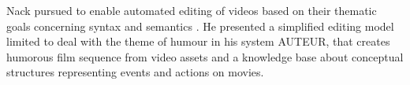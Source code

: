 Nack pursued to enable automated editing of videos based on their thematic goals concerning syntax and semantics \cite{nack1997application}.
He presented a simplified editing model limited to deal with the theme of humour in his system AUTEUR, that creates humorous film sequence from video assets and a knowledge base about conceptual structures representing events and actions on movies.
